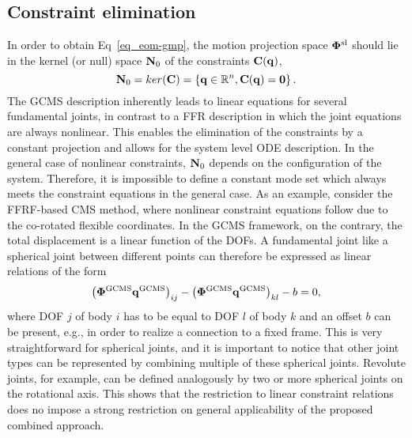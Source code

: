 \subsection{Constraint elimination}
\label{sec:constraint_elimination}
In order to obtain Eq~\eqref{eq_eom-gmp}, the motion projection space $\bm \Phi^{\rm sl}$ should lie in the kernel (or null) space $\mathbf N_0$ of the constraints $\mathbf C(\mathbf q)$,
\begin{equation}
\mathbf N_0 = ker(\mathbf C) = \left\{\mathbf q \in \mathbb{R}^{n} , \mathbf C(\mathbf q) = \mathbf{0} \right\}.
\end{equation}
The GCMS description inherently leads to linear equations for several fundamental joints, in contrast to a FFR description in which the joint equations are always nonlinear. This enables the elimination of the constraints by a constant projection and allows for the system level ODE description. 
In the general case of nonlinear constraints, $\mathbf N_0$ depends on the configuration of the system. Therefore, it is impossible to define a constant mode set which always meets the constraint equations in the general case. 
As an example, consider the FFRF-based CMS method, where nonlinear constraint equations follow due to the co-rotated flexible coordinates. 
In the GCMS framework, on the contrary, the total displacement is a linear function of the DOFs. 
A fundamental joint like a spherical joint between different points can therefore be expressed as linear relations of the form
\begin{equation}
\left(\bm \Phi^{\rm GCMS}\mathbf q^{\rm GCMS}\right)_{ij} - \left(\bm \Phi^{\rm GCMS}\mathbf q^{\rm GCMS}\right)_{kl} - b = 0,
\end{equation}
where DOF $j$ of body $i$ has to be equal to DOF $l$ of body $k$ and an offset $b$ can be present, e.g., in order to realize a connection to a fixed frame. 
This is very straightforward for spherical joints, and it is important to notice that other joint types can be represented by combining multiple of these spherical joints. Revolute joints, for example, can be defined analogously by two or more spherical joints on the rotational axis. 
This shows that the restriction to linear constraint relations does no impose a strong restriction on general applicability of the proposed combined approach.

